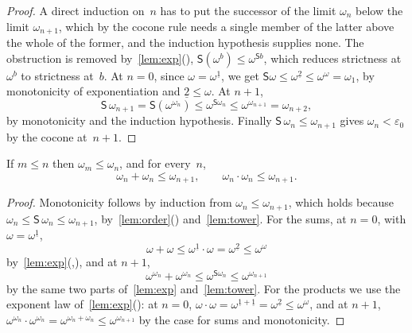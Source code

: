 \documentclass[11pt]{amsart}
\makeatletter
\newcommand{\bS}{\mathsf{S}}
\newcommand{\bplus}{\mathbin{+}}
\newcommand{\btimes}{\mathbin{\cdot}}
\newcommand{\num}[1]{\underline{#1}}          %
\newcommand{\eps}{\varepsilon_{0}}
\newcommand{\tower}[1]{\omega_{#1}}           %
\newif\ifagdarefs
\newcommand{\AgdaRefs}[1]{\ifagdarefs{\footnotesize\color{agdablue}(#1)}\else\unskip\fi}
\newcommand{\Agda}[2]{{\footnotesize\color{agdablue}\textsf{#1}%
  \ifblank{#2}{}{\texttt{.}\allowbreak\texttt{#2}}}}
\let\ttt@plain\texttt
\renewcommand{\texttt}[1]{{\footnotesize\color{agdablue}\ttt@plain{#1}}}
\theoremstyle{plain}
\theoremstyle{definition}
\makeatother
\begin{document}
\begin{proof}
A direct induction on~$n$ has to put the successor of the limit
$\tower n$ below the limit $\tower{n+1}$, which by the cocone rule
needs a single member of the latter above the whole of the former,
and the induction hypothesis supplies none. The obstruction is
removed by~\cref{lem:exp}(),
$\bS(\omega^{b}) \le \omega^{\bS b}$, which reduces strictness at
$\omega^{b}$ to strictness at~$b$. At $n = 0$, since
$\omega = \omega^{\num 1}$, we get
$\bS\omega \le \omega^{\num 2} \le \omega^{\omega} = \tower 1$, by
monotonicity of exponentiation and $\num 2 \le \omega$. At $n+1$,
\[
  \bS\,\tower{n+1} = \bS(\omega^{\tower n}) \le \omega^{\bS\tower n}
  \le \omega^{\tower{n+1}} = \tower{n+2} ,
\]
by monotonicity and the induction hypothesis. Finally
$\bS\,\tower n \le \tower{n+1}$ gives $\tower n < \eps$ by the cocone
at~$n+1$.
\AgdaRefs{\Agda{BrouwerOrdinals.Epsilon0}{S-ω\^{}-step};
\texttt{ω\^{}-ι1}, \texttt{ω<ω\^{}ω}.}
\end{proof}

\begin{lemma}
\label{lem:tower-absorb}
If $m \le n$ then $\tower m \le \tower n$, and for every~$n$,
\[
  \tower n \bplus \tower n \le \tower{n+1} , \qquad
  \tower n \btimes \tower n \le \tower{n+1} .
\]
\AgdaRefs{\Agda{BrouwerOrdinals.Epsilon0}{tower-mono-step};
\texttt{tower-mono-ℕ}, \texttt{tower-double};
\Agda{BrouwerOrdinals.MultClosure}{tower-sq}.}
\end{lemma}

\begin{proof}
Monotonicity follows by induction from
$\tower n \le \tower{n+1}$, which holds because
$\tower n \le \bS\,\tower n \le \tower{n+1}$,
by~\cref{lem:order}() and~\cref{lem:tower}. For the sums, at $n = 0$, with
$\omega = \omega^{\num 1}$,
\[
  \omega \bplus \omega \le \omega^{\num 1} \btimes \omega
  = \omega^{\num 2} \le \omega^{\omega}
\]
by~\cref{lem:exp}(,),
and at $n+1$,
\[
  \omega^{\tower n} \bplus \omega^{\tower n}
  \le \omega^{\bS\tower n} \le \omega^{\tower{n+1}}
\]
by the same two parts of~\cref{lem:exp} and~\cref{lem:tower}. For the
products we use the exponent law
of~\cref{lem:exp}(): at $n = 0$,
$\omega \btimes \omega = \omega^{\num 1 \bplus \num 1}
= \omega^{\num 2} \le \omega^{\omega}$, and at $n+1$,
$\omega^{\tower n} \btimes \omega^{\tower n}
= \omega^{\tower n \bplus \tower n} \le \omega^{\tower{n+1}}$ by the
case for sums and monotonicity.
\end{proof}
\end{document}
